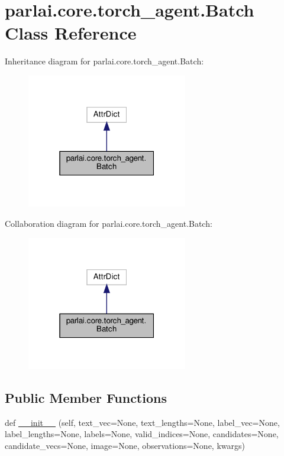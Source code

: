 \hypertarget{classparlai_1_1core_1_1torch__agent_1_1Batch}{}\section{parlai.\+core.\+torch\+\_\+agent.\+Batch Class Reference}
\label{classparlai_1_1core_1_1torch__agent_1_1Batch}


Inheritance diagram for parlai.\+core.\+torch\+\_\+agent.\+Batch\+:
\nopagebreak
\begin{figure}[H]
\begin{center}
\leavevmode
\includegraphics[width=199pt]{classparlai_1_1core_1_1torch__agent_1_1Batch__inherit__graph}
\end{center}
\end{figure}


Collaboration diagram for parlai.\+core.\+torch\+\_\+agent.\+Batch\+:
\nopagebreak
\begin{figure}[H]
\begin{center}
\leavevmode
\includegraphics[width=199pt]{classparlai_1_1core_1_1torch__agent_1_1Batch__coll__graph}
\end{center}
\end{figure}
\subsection*{Public Member Functions}
\begin{DoxyCompactItemize}
\item 
def \hyperlink{classparlai_1_1core_1_1torch__agent_1_1Batch_a6ef9b406e741e455da515aa8f84c798e}{\+\_\+\+\_\+init\+\_\+\+\_\+} (self, text\+\_\+vec=None, text\+\_\+lengths=None, label\+\_\+vec=None, label\+\_\+lengths=None, labels=None, valid\+\_\+indices=None, candidates=None, candidate\+\_\+vecs=None, image=None, observations=None, kwargs)
\end{DoxyCompactItemize}


